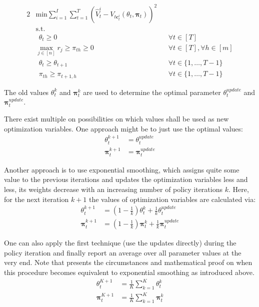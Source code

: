 \begin{alignat}{2}
& \text{min} \sum_{i=1}^{I}\sum_{t=1}^{T} \left( \hat{V}_t^i - V_{t\boldsymbol{c}_t^i}(\theta_t, \boldsymbol{\pi}_t) \right)^2 &&\label{opt-updateParam-beginning} \\
& \text{s.t. } && \\
& ~~\theta_t \geq 0 && \forall t \in [T]\\
& \max_{j \in [n]} r_j \geq \pi_{th} \geq 0 && \forall t \in [T], \forall h \in [m]\\
& ~~\theta_t \geq \theta_{t+1} && \forall t \in \{1, \dots, T-1\}\\
& ~~\pi_{th} \geq \pi_{t+1,h} && \forall t \in \{1, \dots, T-1\}\label{opt-updateParam-end}
\end{alignat}

The old values $\theta_t^k$ and $\boldsymbol{\pi}_t^k$ are used to determine the optimal parameter $\theta_t^{update}$ and $\boldsymbol{\pi}_t^{update}$.

There exist multiple on possibilities on which values shall be used as new optimization variables. One approach might be to just use the optimal values:
\begin{align}
\theta_t^{k+1} &= \theta_t^{update}\label{dir-1}\\
\boldsymbol{\pi}_t^{k+1} &= \boldsymbol{\pi}_t^{update}\label{dir-2}
\end{align}

Another approach is to use exponential smoothing, which assigns quite some value to the previous iterations and updates the optimization variables less and less, \ie its weights decrease with an increasing number of policy iterations $k$. Here, for the next iteration $k+1$ the values of optimization variables are calculated via:
\begin{align}
\theta_t^{k+1} &= \left(1- \frac{1}{k} \right)	\theta_t^k + \frac{1}{k} \theta_t^{update}\label{expSM-1}\\
\boldsymbol{\pi}_t^{k+1} &= \left(1- \frac{1}{k} \right)	\boldsymbol{\pi}_t^k + \frac{1}{k} \boldsymbol{\pi}_t^{update}\label{expSM-2}
\end{align}

One can also apply the first technique (use the updates directly) during the policy iteration and finally report an average over all parameter values at the very end. Note that  presents the circumstances and mathematical proof on when this procedure becomes equivalent to exponential smoothing as introduced above.
\begin{align}
\theta_t^{K+1} &= \frac{1}{K}\sum_{k=1}^{K}\theta_t^k\\
\boldsymbol{\pi}_t^{K+1} &= \frac{1}{K}\sum_{k=1}^{K}\boldsymbol{\pi}_t^k
\end{align}


